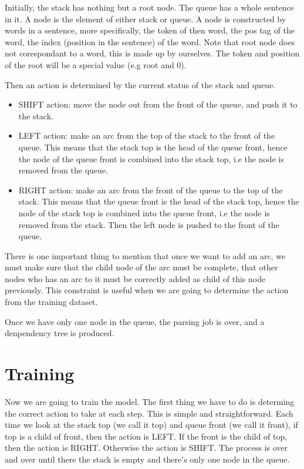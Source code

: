 \documentclass[11pt]{article}
\begin{document}
Initially, the stack has nothing but a root node. The queue has a whole sentence in it. A node is the element of either stack or queue. A node is constructed by words in a sentence, more specifically, the token of then word, the pos tag of the word, the index (position in the sentence) of the word. Note that root node does not corespondant to a word, this is made up by ourselves. The token and position of the root will be a special value (e.g root and 0).

Then an action is determined by the current status of the stack and queue.

\begin{itemize}
\item SHIFT action: move the node out from the front of the queue, and push it to the stack.
\item LEFT action: make an arc from the top of the stack to the front of the queue. This means that the stack top is the head of the queue front, hence the node of the queue front is combined into the stack top, i.e the node is removed from the queue.
\item RIGHT action: make an arc from the front of the queue to the top of the stack. This means that the queue front is the head of the stack top, hence the node of the stack top is combined into the queue front, i.e the node is removed from the stack. Then the left node is pushed to the front of the queue.
\end{itemize}

There is one important thing to mention that once we want to add an arc, we must make sure that the child node of the arc must be complete, that other nodes who has an arc to it must be correctly added as child of this node previously. This constraint is useful when we are going to determine the action from the training dataset.

Once we have only one node in the queue, the parsing job is over, and a denpendency tree is produced.

\section{Training}

Now we are going to train the model. The first thing we have to do is determing the correct action to take at each step. This is simple and straightforward. Each time we look at the stack top (we call it top) and queue front (we call it front), if top is a child of front, then the action is LEFT. If the front is the child of top, then the action is RIGHT. Otherwise the action is SHIFT. The process is over and over until there the stack is empty and there's only one node in the queue.
\end{document}
